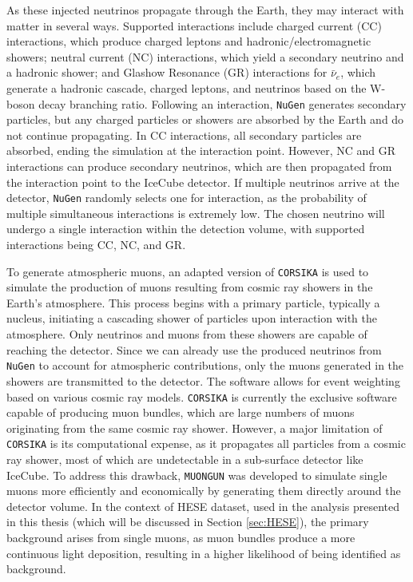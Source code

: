 As these injected neutrinos propagate through the Earth, they may interact with matter in several ways. Supported interactions include charged current (CC) interactions, which produce charged leptons and hadronic/electromagnetic showers; neutral current (NC) interactions, which yield a secondary neutrino and a hadronic shower; and Glashow Resonance (GR) interactions for \(\bar{\nu}_e\), which generate a hadronic cascade, charged leptons, and neutrinos based on the W-boson decay branching ratio. Following an interaction, \texttt{NuGen} generates secondary particles, but any charged particles or showers are absorbed by the Earth and do not continue propagating. In CC interactions, all secondary particles are absorbed, ending the simulation at the interaction point. However, NC and GR interactions can produce secondary neutrinos, which are then propagated from the interaction point to the IceCube detector. If multiple neutrinos arrive at the detector, \texttt{NuGen} randomly selects one for interaction, as the probability of multiple simultaneous interactions is extremely low. The chosen neutrino will undergo a single interaction within the detection volume, with supported interactions being CC, NC, and GR. 

To generate atmospheric muons, an adapted version of \texttt{CORSIKA}  is used to simulate the production of muons resulting from cosmic ray showers in the Earth's atmosphere. This process begins with a primary particle, typically a nucleus, initiating a cascading shower of particles upon interaction with the atmosphere. Only neutrinos and muons from these showers are capable of reaching the detector. Since we can already use the produced neutrinos from \texttt{NuGen} to account for atmospheric contributions, only the muons generated in the showers are transmitted to the detector. The software allows for event weighting based on various cosmic ray models. \texttt{CORSIKA} is currently the exclusive software capable of producing muon bundles, which are large numbers of muons originating from the same cosmic ray shower. However, a major limitation of \texttt{CORSIKA} is its computational expense, as it propagates all particles from a cosmic ray shower, most of which are undetectable in a sub-surface detector like IceCube. To address this drawback, \texttt{MUONGUN}  was developed to simulate single muons more efficiently and economically by generating them directly around the detector volume. In the context of HESE dataset, used in the analysis presented in this thesis (which will be discussed in Section \ref{sec:HESE}), the primary background arises from single muons, as muon bundles produce a more continuous light deposition, resulting in a higher likelihood of being identified as background.

